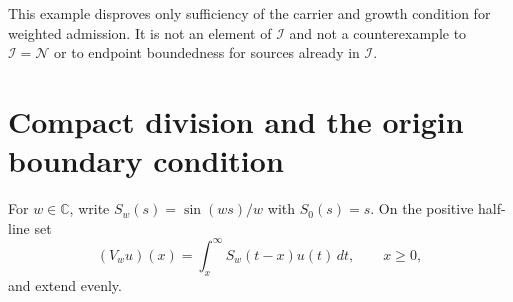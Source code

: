 \documentclass[11pt,a4paper]{article}
\numberwithin{equation}{section}
\theoremstyle{definition}
\theoremstyle{remark}
\newcommand{\C}{\mathbb C}
\newcommand{\Nn}{\mathcal N}
\newcommand{\Ii}{\mathcal I}
\begin{document}
This example disproves only sufficiency of the carrier and growth condition for weighted admission. It is not an element of $\Ii$ and not a counterexample to $\Ii=\Nn$ or to endpoint boundedness for sources already in $\Ii$.


\section{Compact division and the origin boundary condition}\label{sec:division}

For $w\in\C$, write $S_w(s)=\sin(ws)/w$ with $S_0(s)=s$. On the positive half-line set
\begin{equation}\label{eq:V-definition}
 (V_wu)(x)=\int_x^\infty S_w(t-x)u(t)\,dt,\qquad x\ge0,
\end{equation}
and extend evenly.
\end{document}
